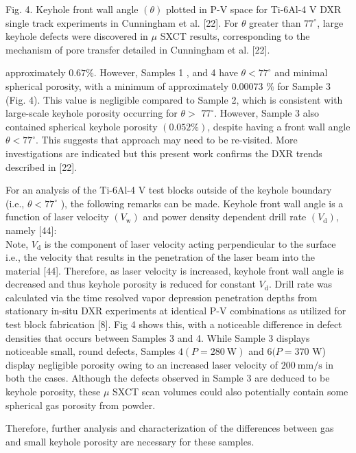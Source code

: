 \documentclass[10pt]{article}
\begin{document}
Fig. 4. Keyhole front wall angle $(\theta)$ plotted in P-V space for Ti-6Al-4 V DXR single track experiments in Cunningham et al. [22]. For $\theta$ greater than $77^{\circ}$, large keyhole defects were discovered in $\mu$ SXCT results, corresponding to the mechanism of pore transfer detailed in Cunningham et al. [22].

approximately $0.67 \%$. However, Samples 1 , and 4 have $\theta<77^{\circ}$ and minimal spherical porosity, with a minimum of approximately 0.00073 $\%$ for Sample 3 (Fig. 4). This value is negligible compared to Sample 2, which is consistent with large-scale keyhole porosity occurring for $\theta>$ $77^{\circ}$. However, Sample 3 also contained spherical keyhole porosity $(0.052 \%)$, despite having a front wall angle $\theta<77^{\circ}$. This suggests that approach may need to be re-visited. More investigations are indicated but this present work confirms the DXR trends described in [22].

For an analysis of the Ti-6Al-4 V test blocks outside of the keyhole boundary (i.e., $\theta<77^{\circ}$ ), the following remarks can be made. Keyhole front wall angle is a function of laser velocity $\left(V_{\mathrm{w}}\right)$ and power density dependent drill rate $\left(V_{\mathrm{d}}\right)$, namely [44]:\\
Note, $V_{\mathrm{d}}$ is the component of laser velocity acting perpendicular to the surface i.e., the velocity that results in the penetration of the laser beam into the material [44]. Therefore, as laser velocity is increased, keyhole front wall angle is decreased and thus keyhole porosity is reduced for constant $V_{\mathrm{d}}$. Drill rate was calculated via the time resolved vapor depression penetration depths from stationary in-situ DXR experiments at identical P-V combinations as utilized for test block fabrication [8]. Fig 4 shows this, with a noticeable difference in defect densities that occurs between Samples 3 and 4. While Sample 3 displays noticeable small, round defects, Samples $4(P=280 \mathrm{~W})$ and $6(P=370$ W) display negligible porosity owing to an increased laser velocity of $200 \mathrm{~mm} / \mathrm{s}$ in both the cases. Although the defects observed in Sample 3 are deduced to be keyhole porosity, these $\mu$ SXCT scan volumes could also potentially contain some spherical gas porosity from powder.

Therefore, further analysis and characterization of the differences between gas and small keyhole porosity are necessary for these samples.
\end{document}
